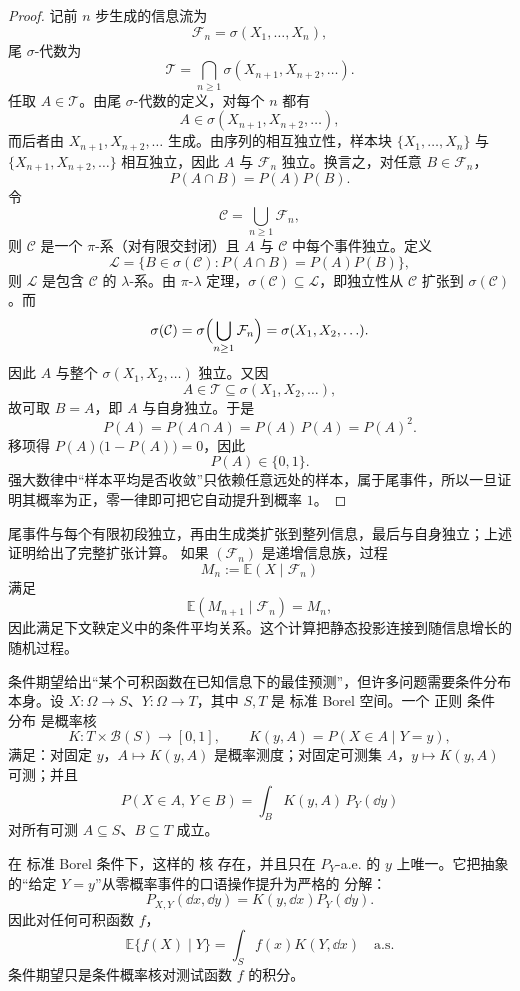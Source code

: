 \begin{proof}
记前 $n$ 步生成的信息流为
\[
\mathcal F_n=\sigma(X_1,\ldots,X_n),
\]
尾 $\sigma$-代数为
\[
\mathcal T=\bigcap_{n\ge1}\sigma(X_{n+1},X_{n+2},\ldots).
\]
任取 $A\in\mathcal T$。由尾 $\sigma$-代数的定义，对每个 $n$ 都有
\[
A\in\sigma(X_{n+1},X_{n+2},\ldots),
\]
而后者由 $X_{n+1},X_{n+2},\ldots$ 生成。由序列的相互独立性，样本块 $\{X_1,\ldots,X_n\}$ 与 $\{X_{n+1},X_{n+2},\ldots\}$ 相互独立，因此 $A$ 与 $\mathcal F_n$ 独立。换言之，对任意 $B\in\mathcal F_n$，
\[
P(A\cap B)=P(A)P(B).
\]
令
\[
\mathcal C=\bigcup_{n\ge1}\mathcal F_n,
\]
则 $\mathcal C$ 是一个 $\pi$-系（对有限交封闭）且 $A$ 与 $\mathcal C$ 中每个事件独立。定义
\[
\mathcal L=\{B\in\sigma(\mathcal C):P(A\cap B)=P(A)P(B)\},
\]
则 $\mathcal L$ 是包含 $\mathcal C$ 的 $\lambda$-系。由 $\pi$-$\lambda$ 定理，$\sigma(\mathcal C)\subseteq\mathcal L$，即独立性从 $\mathcal C$ 扩张到 $\sigma(\mathcal C)$。而
\[
\sigma(\mathcal C)
=\sigma\Bigl(\bigcup_{n\ge1}\mathcal F_n\Bigr)
=\sigma(X_1,X_2,\ldots).
\]
因此 $A$ 与整个 $\sigma(X_1,X_2,\ldots)$ 独立。又因
\[
A\in\mathcal T\subseteq\sigma(X_1,X_2,\ldots),
\]
故可取 $B=A$，即 $A$ 与自身独立。于是
\[
P(A)=P(A\cap A)=P(A)\,P(A)=P(A)^2.
\]
移项得 $P(A)\bigl(1-P(A)\bigr)=0$，因此
\[
P(A)\in\{0,1\}.
\]
强大数律中“样本平均是否收敛”只依赖任意远处的样本，属于尾事件，所以一旦证明其概率为正，零一律即可把它自动提升到概率 $1$。
\end{proof}

尾事件与每个有限初段独立，再由生成类扩张到整列信息，最后与自身独立；上述证明给出了完整扩张计算。
如果 $(\mathcal F_n)$ 是递增信息族，过程
\[
M_n:=\mathbb E(X\mid\mathcal F_n)
\]
满足
\[
\mathbb E(M_{n+1}\mid\mathcal F_n)=M_n,
\]
因此满足下文鞅定义中的条件平均关系。这个计算把静态投影连接到随信息增长的随机过程。

条件期望给出“某个可积函数在已知信息下的最佳预测”，但许多问题需要条件分布本身。设 $X:\Omega\to S$、$Y:\Omega\to T$，其中 $S,T$ 是 标准 Borel 空间。一个 正则 条件 分布 是概率核
\[
K:T\times\mathcal B(S)\to[0,1],
\qquad
K(y,A)=P(X\in A\mid Y=y),
\]
满足：对固定 $y$，$A\mapsto K(y,A)$ 是概率测度；对固定可测集 $A$，$y\mapsto K(y,A)$ 可测；并且
\begin{equation*}P(X\in A,\,Y\in B)
=\int_B K(y,A)\,P_Y(\dd y)\end{equation*}
对所有可测 $A\subseteq S$、$B\subseteq T$ 成立。

在 标准 Borel 条件下，这样的 核 存在，并且只在 $P_Y$-a.e. 的 $y$ 上唯一。它把抽象的“给定 $Y=y$”从零概率事件的口语操作提升为严格的 分解：
\begin{equation*}{
P_{X,Y}(\dd x,\dd y)
=K(y,\dd x)P_Y(\dd y).
}\end{equation*}
因此对任何可积函数 $f$，
\begin{equation*}{
\mathbb E\{f(X)\mid Y\}
=\int_S f(x)K(Y,\dd x)
\quad\text{a.s.}
}\end{equation*}
条件期望只是条件概率核对测试函数 $f$ 的积分。

